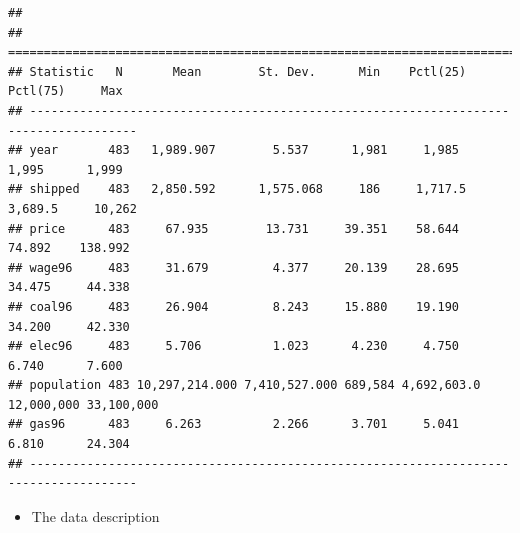 \documentclass[]{book}
\providecommand{\tightlist}{%
  \setlength{\itemsep}{0pt}\setlength{\parskip}{0pt}}
\begin{document}
\begin{verbatim}
## 
## =====================================================================================
## Statistic   N       Mean        St. Dev.      Min    Pctl(25)    Pctl(75)     Max    
## -------------------------------------------------------------------------------------
## year       483   1,989.907        5.537      1,981     1,985      1,995      1,999   
## shipped    483   2,850.592      1,575.068     186     1,717.5    3,689.5     10,262  
## price      483     67.935        13.731     39.351    58.644      74.892    138.992  
## wage96     483     31.679         4.377     20.139    28.695      34.475     44.338  
## coal96     483     26.904         8.243     15.880    19.190      34.200     42.330  
## elec96     483     5.706          1.023      4.230     4.750      6.740      7.600   
## population 483 10,297,214.000 7,410,527.000 689,584 4,692,603.0 12,000,000 33,100,000
## gas96      483     6.263          2.266      3.701     5.041      6.810      24.304  
## -------------------------------------------------------------------------------------
\end{verbatim}

\begin{itemize}
\tightlist
\item
  The data description
\end{itemize}
\end{document}
